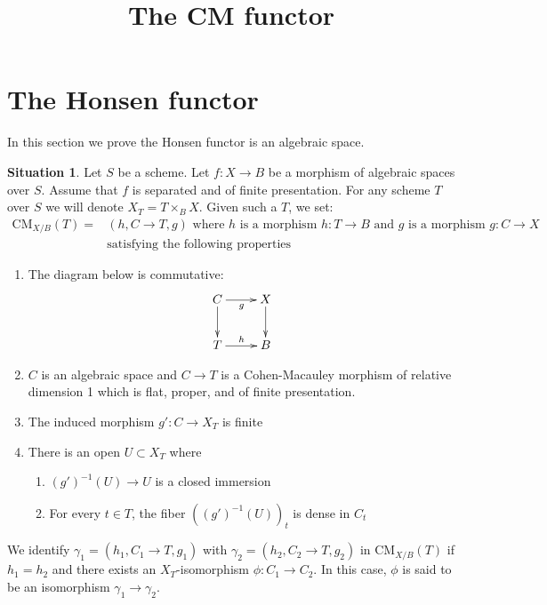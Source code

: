 \documentclass{stacks-project}
\theoremstyle{plain}
\theoremstyle{definition}
\newtheorem{situation}[subsection]{Situation}
\theoremstyle{remark}
\numberwithin{equation}{subsection}
\def\CMfunctor{\mathcal{C}\!{\it oh}}
\def\CMfunctor{\text{CM}}
\begin{document}
\title{The CM functor}


\maketitle


\section{The Honsen functor}
\label{section-cm}

\noindent
In this section we prove the Honsen functor is an algebraic space.\\

\begin{situation}
\label{situation-cm}
Let $S$ be a scheme. Let $f : X \to B$ be a morphism of algebraic spaces
over $S$. Assume that $f$ is separated and of finite presentation.
For any scheme $T$ over $S$ we will denote $X_T=T\times_B X$. Given such a $T$, we set:
\begin{align*}
\CMfunctor_{X/B}(T) = & (h, C \to T, g)  \text{ where } 
h \text{ is a morphism } h : T \to B \text{ and } g \text{ is a morphism } g : C \to X \\ & \text{satisfying the following properties}
\end{align*}
\begin{enumerate}
\item\label{situation-cm-diagram} The diagram below is commutative: 
$$
\xymatrix{
C \ar[r]_g \ar[d] & X \ar[d] \\
T \ar[r]^h & B
}
$$
\item\label{situation-cm-morphism} $C$ is an algebraic space and $C \to T$ is a Cohen-Macauley morphism of relative dimension 1 which is flat, proper, and of finite presentation.
\item\label{situation-cm-finite} The induced morphism $g' : C \to X_T$ is finite
\item\label{situation-cm-open} There is an open $U \subset X_T$ where
\begin{enumerate}
\item $(g')^{-1}(U) \to U$ is a closed immersion
\item For every $t \in T$, the fiber $\left((g')^{-1}(U)\right)_t$ is dense in $C_t$
\end{enumerate}
\end{enumerate}
    We identify $\gamma_1 = (h_1,C_1 \rightarrow T,g_1)$ with $\gamma_2 = (h_2,C_2 \rightarrow T,g_2)$ in $\CMfunctor_{X/B}(T)$ if $h_1 = h_2$ and there exists an $X_T$-isomorphism $\phi\colon C_1 \rightarrow C_2$. In this case, $\phi$ is said to be an isomorphism $\gamma_1 \rightarrow \gamma_2$.
\end{situation}
\end{document}
